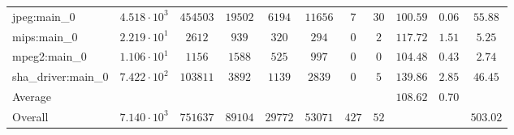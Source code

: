 \begin{tabular}{|l|c|c|c|c|c|c|c|c|c|c|}
jpeg:main\_0            & $ 4.518 \cdot 10^{3}  $ & $ 454503 $ & $ 19502 $ & $ 6194  $ & $ 11656 $ & $ 7   $ & $ 30 $ & $ 100.59      $ & $ 0.06    $ & $ 55.88   $ \\
mips:main\_0            & $ 2.219 \cdot 10^{1}  $ & $ 2612   $ & $ 939   $ & $ 320   $ & $ 294   $ & $ 0   $ & $ 2  $ & $ 117.72      $ & $ 1.51    $ & $ 5.25    $ \\
mpeg2:main\_0           & $ 1.106 \cdot 10^{1}  $ & $ 1156   $ & $ 1588  $ & $ 525   $ & $ 997   $ & $ 0   $ & $ 0  $ & $ 104.48      $ & $ 0.43    $ & $ 2.74    $ \\
sha\_driver:main\_0     & $ 7.422 \cdot 10^{2}  $ & $ 103811 $ & $ 3892  $ & $ 1139  $ & $ 2839  $ & $ 0   $ & $ 5  $ & $ 139.86      $ & $ 2.85    $ & $ 46.45   $ \\
\hline
Average                 & $                     $ & $        $ & $       $ & $       $ & $       $ & $     $ & $    $ & $ 108.62      $ & $ 0.70    $ & $         $ \\
\hline
Overall                 & $ 7.140 \cdot 10^{3}  $ & $ 751637 $ & $ 89104 $ & $ 29772 $ & $ 53071 $ & $ 427 $ & $ 52 $ & $             $ & $         $ & $ 503.02  $ \\
\hline
\end{tabular}
